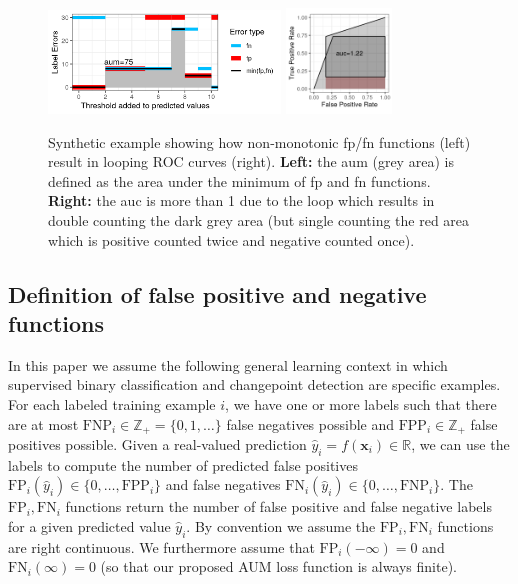 \documentclass{article}
\begin{document}
\begin{figure}[ht]
\vskip 0.2in
\begin{center}
\includegraphics[width=0.55\textwidth]{figure-more-than-one-more-aum.png}
\includegraphics[width=0.25\textwidth]{figure-more-than-one-more-auc.png}
\vskip -0.5cm
\caption{Synthetic example showing how non-monotonic fp/fn functions (left) result in looping ROC curves (right). 
\textbf{Left:} the aum (grey area) is defined as the area under the minimum of fp and fn functions.
\textbf{Right:} the auc is more than 1 due to the loop which results in double counting the dark grey area (but single counting the red area which is positive counted twice and negative counted once).
}
\label{fig:more}
\end{center}
\vskip -0.2in
\end{figure}

\subsection{Definition of false positive and negative functions}


In this paper we assume the following general learning context in which supervised binary classification and changepoint detection are specific examples. 
For each labeled training example $i$, we have one or more labels such that there are at most $\text{FNP}_i\in\mathbb Z_+=\{0, 1, \dots\}$  false negatives possible and $\text{FPP}_i\in\mathbb Z_+$ false positives possible.
Given a real-valued prediction $\hat y_i=f(\mathbf x_i)\in\mathbb R$, we can use the labels to compute the number of predicted false positives $\text{FP}_i(\hat y_i)\in \{0, \dots, \text{FPP}_i\}$ and false negatives $\text{FN}_i(\hat y_i)\in\{0, \dots, \text{FNP}_i\}$.
The $\text{FP}_i,\text{FN}_i$ functions return the number of false positive and false negative labels for a given predicted value $\hat y_i$. 
By convention we assume the $\text{FP}_i,\text{FN}_i$ functions are right continuous.
We furthermore assume that $\text{FP}_i(-\infty)=0$ and $\text{FN}_i(\infty)=0$ (so that our proposed AUM loss function is always finite).
\end{document}

